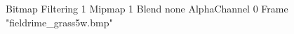 {Bitmap
	{Filtering 1}
	{Mipmap 1}
	{Blend none}
	{AlphaChannel 0}
	{Frame "fieldrime_grass5w.bmp"}
}
